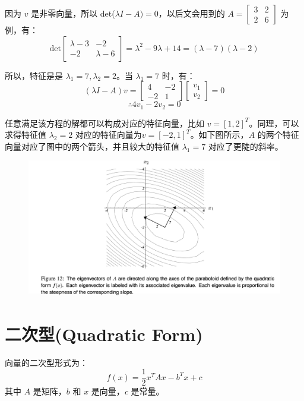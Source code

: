 \documentclass[12pt]{article}
\begin{document}
因为 $v$ 是非零向量，所以 det($\lambda I - A) = 0$，以后文会用到的 $A = \begin{bmatrix}3 & 2 \\ 2 & 6\end{bmatrix}$ 为例，有：
$$
\text{det}\begin{bmatrix}
\lambda - 3 & -2 \\ -2 & \lambda -6
\end{bmatrix} = \lambda^2 - 9\lambda + 14 = (\lambda - 7)(\lambda - 2)
$$

所以，特征是是 $\lambda_1 = 7, \lambda_2 = 2$。当 $\lambda_1 = 7$ 时，有：
$$
(\lambda I - A) v = \begin{bmatrix}4 & -2 \\ -2 & 1\end{bmatrix}\begin{bmatrix}v_1 \\ v_2 \end{bmatrix} = 0
$$
$$
\therefore 4v_1 - 2v_2 = 0
$$

任意满足该方程的解都可以构成对应的特征向量，比如 $v = [1, 2]^T$。同理，可以求得特征值 $\lambda_2 = 2$ 对应的特征向量为$v = [-2, 1]^T$。如下图所示，$A$ 的两个特征向量对应了图中的两个箭头，并且较大的特征值 $\lambda_1 = 7$ 对应了更陡的斜率。

\begin{figure}[H]
    \centering
    \includegraphics[width=1\textwidth]{fig/CG_Plot_Eightvalue_4.png}
\end{figure}

\section{二次型(Quadratic Form)}
向量的二次型形式为：
$$
f(x) = \frac{1}{2}x^TAx - b^Tx + c
$$
其中 $A$ 是矩阵，$b$ 和 $x$ 是向量，$c$ 是常量。
\end{document}
